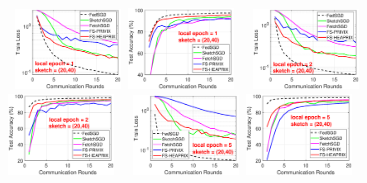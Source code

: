 \documentclass[sigconf, anonymous, review]{acmart}
\begin{document}
\begin{figure}[H]
	\begin{center}
		\mbox{\hspace{-0.25in}			  
		 \includegraphics[width=0.25\textwidth]{MNIST_figures/local1_sketch20_iid1_train_loss.eps} \hspace{-0.12in}
		 \includegraphics[width=0.25\textwidth]{MNIST_figures/local1_sketch20_iid1_test_acc.eps} 
		 }
		 		\mbox{\hspace{-0.25in}		
		\includegraphics[width=0.25\textwidth]{MNIST_figures/local2_sketch20_iid1_train_loss.eps}\hspace{-0.12in}
		\includegraphics[width=0.25\textwidth]{MNIST_figures/local2_sketch20_iid1_test_acc.eps}
		}
		 		\mbox{\hspace{-0.25in}		
		\includegraphics[width=0.25\textwidth]{MNIST_figures/local5_sketch20_iid1_train_loss.eps}\hspace{-0.12in}
		\includegraphics[width=0.25\textwidth]{MNIST_figures/local5_sketch20_iid1_test_acc.eps}
}
\end{center}
\end{figure}
\end{document}
